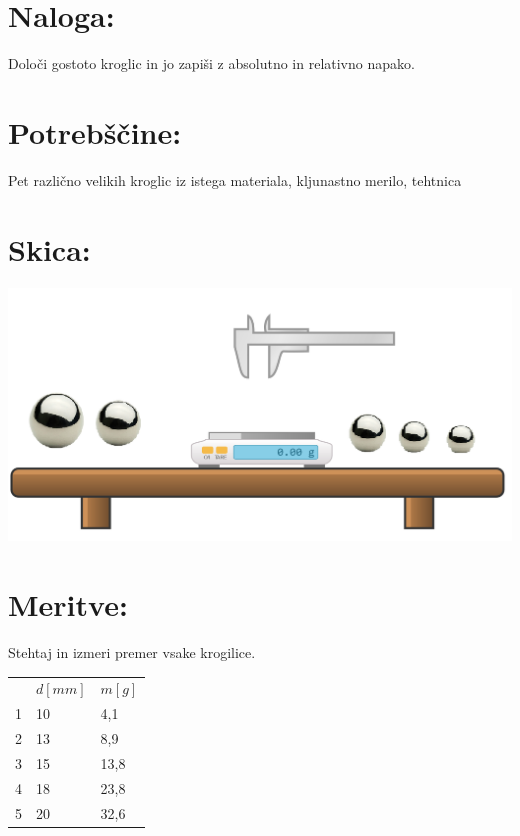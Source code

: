 \documentclass[a4paper]{article}
\begin{document}



\section*{Naloga:} %

Določi gostoto kroglic in jo zapiši z absolutno in relativno napako.

\section*{Potrebščine:}

Pet različno velikih kroglic iz istega materiala, kljunastno merilo, tehtnica

\section*{Skica:}
\begin{center}
\includegraphics[scale=0.5]{skica.png}
\end{center}
\section*{Meritve:}

Stehtaj in izmeri premer vsake krogilice.

\begin{table}[H]
   \centering
\begin{tabular}{lll}
   & $d[mm]$ & $m[g]$ \\
   1 & 10     & 4,1  \\
   2 & 13     & 8,9  \\
   3 & 15     & 13,8 \\
   4 & 18     & 23,8 \\
   5 & 20     & 32,6
\end{tabular}
\end{table}
\end{document}

